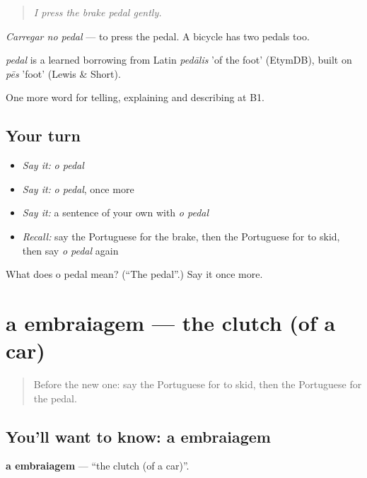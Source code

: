\begin{quote}
\emph{I press the brake pedal gently.}
\end{quote}

\emph{Carregar no pedal} — to press the pedal. A bicycle has two pedals too.

\begin{cousinweb}
\emph{pedal} is a learned borrowing from Latin \emph{pedālis} 'of the foot' (EtymDB), built on \emph{pēs} 'foot' (Lewis \& Short).
\end{cousinweb}

\begin{grammarlens}[title={What you've built}]
One more word for telling, explaining and describing at B1.
\end{grammarlens}

\subsection*{Your turn}
\begin{itemize}
\raggedright
  \item \emph{Say it:} \emph{o pedal}
  \item \emph{Say it:} \emph{o pedal}, once more
  \item \emph{Say it:} a sentence of your own with \emph{o pedal}
  \item \emph{Recall:} say the Portuguese for the brake, then the Portuguese for to skid, then say \emph{o pedal} again
\end{itemize}

\begin{tcolorbox}[breakable,colback=teal!4,colframe=teal!35!black,title={Before you move on}]
What does o pedal mean? (\textquotedblleft{}The pedal\textquotedblright{}.) Say it once more.
\end{tcolorbox}
\section[a embraiagem]{a embraiagem — the clutch (of a car)}

\label{lesson:PT-C402-embraiagem}



\begin{quote}
Before the new one: say the Portuguese for to skid, then the Portuguese for the pedal.
\end{quote}

\subsection*{You'll want to know: a embraiagem}
\textbf{a embraiagem} — \textquotedblleft{}the clutch (of a car)\textquotedblright{}.

